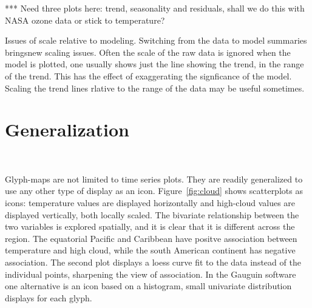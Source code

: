 \documentclass[oneside]{article}
\begin{document}

*** Need three plots here: trend, seasonality and residuals, shall we do this with NASA ozone data or stick to temperature?

Issues of scale relative to modeling. Switching from the data to model summaries bringsnew scaling issues. Often the scale of the raw data is ignored when the model is plotted, one usually shows just the line showing the trend, in the range of the trend. This has the effect of exaggerating the signficance of the model. Scaling the trend lines rlative to the range of the data may be useful sometimes.

\section{Generalization}~\label{sec:scatter}

Glyph-maps are not limited to time series plots. They are readily generalized to use any other type of display as an icon. Figure~\ref{fig:cloud} shows scatterplots as icons: temperature values are displayed horizontally and high-cloud values are displayed vertically, both locally scaled. The bivariate relationship between the two variables is explored spatially, and it is clear that it is different across the region. The equatorial Pacific and Caribbean have positve association between temperature and high cloud, while the south American continent has negative association. The second plot displays a loess curve fit to the data instead of the individual points, sharpening the view of association. In the Gauguin software \citep{gribov:2006} one alternative is an icon based on a histogram, small univariate distribution displays for each glyph. 
\end{document}

